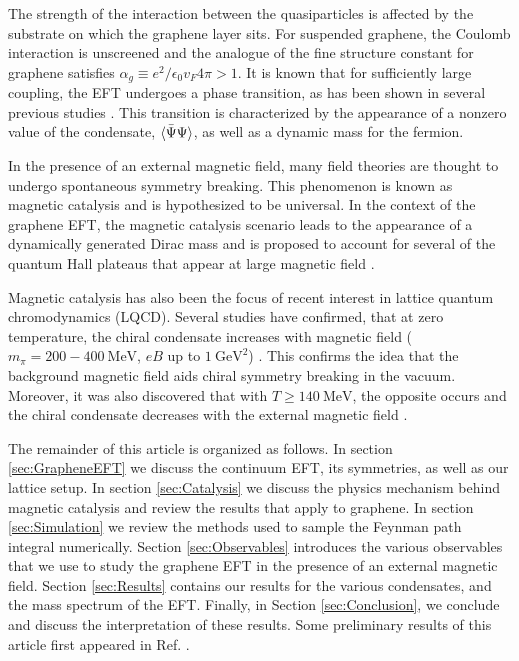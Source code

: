 \documentclass[aps,prd,twocolumn,showpacs,superscriptaddress,groupedaddress]{revtex4}  %
\begin{document}
The strength of the interaction between the quasiparticles is affected by the substrate on which the graphene layer sits. For suspended graphene, the Coulomb interaction is unscreened
and the analogue of the fine structure constant for graphene satisfies $\alpha_g \equiv e^2/\epsilon_0 v_F 4\pi > 1$. It is known that for sufficiently large coupling, the EFT undergoes a phase transition, as has been shown in 
several previous studies \cite{Drut1, Drut2, Hands1, Hands2}. This transition is characterized by the appearance of a nonzero value of the condensate, ${\langle {\bar \Psi} \Psi \rangle}$, as well as a dynamic mass
for the fermion.

In the presence of an external magnetic field, many field theories are thought to undergo spontaneous symmetry breaking. This phenomenon is known as magnetic catalysis and is hypothesized to be universal. In the context of the graphene EFT, the magnetic
catalysis scenario leads to the appearance of a dynamically generated Dirac mass and is proposed to account for several of the quantum Hall plateaus that appear at large magnetic field \cite{ZhangQHE,JiangQHE}.

Magnetic catalysis has also been the focus of recent interest in lattice quantum chromodynamics (LQCD). Several studies have confirmed, that at zero temperature, the chiral condensate
increases with magnetic field ($m_{\pi} = 200-400 ~\text{MeV}$, $eB$ up to $1 ~\text{GeV}^2$) \cite{Buividovich,Braguta}. This confirms the idea that the background magnetic field aids chiral symmetry breaking in the vacuum.
Moreover, it was also discovered that with $T \geq 140 ~\text{MeV}$, the opposite occurs and the chiral condensate decreases with the external magnetic field \cite{Bali1,Bali2}.

The remainder of this article is organized as follows. In section \ref{sec:GrapheneEFT} we discuss the continuum EFT, its symmetries, as well as our lattice setup.
In section \ref{sec:Catalysis} we discuss the physics mechanism behind magnetic catalysis and review the results that apply to graphene. In section \ref{sec:Simulation} we review the methods used to sample the Feynman path integral numerically. Section \ref{sec:Observables} introduces the various observables that we use to study the graphene EFT in the presence of an external magnetic field. Section \ref{sec:Results} contains our results for the various condensates, and the mass spectrum of the EFT.
Finally, in Section \ref{sec:Conclusion}, we conclude and discuss the interpretation of these results. Some preliminary results of this article first appeared in Ref. \cite{DPF2015}.
\end{document}
